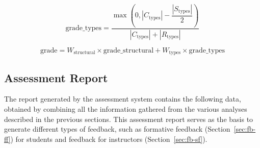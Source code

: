 \begin{chapterBody}
\begin{equation*}
\text{grade\_types} = \dfrac{
\max \left(
  0,
  \left| C_{\text{types}} \right| -
  \dfrac{\left| S_{\text{types}} \right|}{2}
\right)
}{
  \left| C_{\text{types}} \right| + \left| R_{\text{types}} \right|
}
\end{equation*}

\begin{equation*}
\text{grade} = W_{\text{structural}} \times \text{grade\_structural} +
W_{\text{types}} \times \text{grade\_types}
\end{equation*}

\subsection{Assessment Report}

The report generated by the assessment system contains the following
data, obtained by combining all the information gathered from the various
analyses described in the previous sections.
This assessment report serves as the basis to generate different types of
feedback, such as formative feedback (Section~\ref{sec:fb-ff}) for students
and feedback for instructors (Section~\ref{sec:fb-sf}).


\end{chapterBody}
